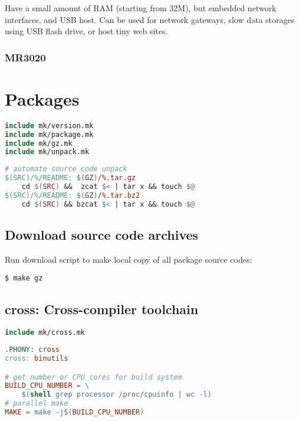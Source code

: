 Have a small amount of RAM (starting from 32M), but embedded network
interfaces, and USB host. Can be used for network gateways, slow data
storages using USB flash drive, or host tiny web sites.

\subsubsection{MR3020}

\section{Packages}

\begin{lstlisting}[language=make,title=Makefile]
include mk/version.mk
include mk/package.mk
include mk/gz.mk
include mk/unpack.mk
\end{lstlisting}

\begin{lstlisting}[language=make,title=mk/unpack]
# automate source code unpack
$(SRC)/%/README: $(GZ)/%.tar.gz
	cd $(SRC) &&  zcat $< | tar x && touch $@
$(SRC)/%/README: $(GZ)/%.tar.bz2
	cd $(SRC) && bzcat $< | tar x && touch $@
\end{lstlisting}

\subsection{Download source code archives}

Run download script to make local copy of all package source codes:
\begin{lstlisting}
$ make gz
\end{lstlisting}

\subsection{cross: Cross-compiler toolchain}

\begin{lstlisting}[language=make,title=Makefile]
include mk/cross.mk
\end{lstlisting}

\begin{lstlisting}[language=make,title=mk/cross]
.PHONY: cross
cross: binutils

# get number or CPU cores for build system
BUILD_CPU_NUMBER = \
	$(shell grep processor /proc/cpuinfo | wc -l)
# parallel make
MAKE = make -j$(BUILD_CPU_NUMBER)
\end{lstlisting}

